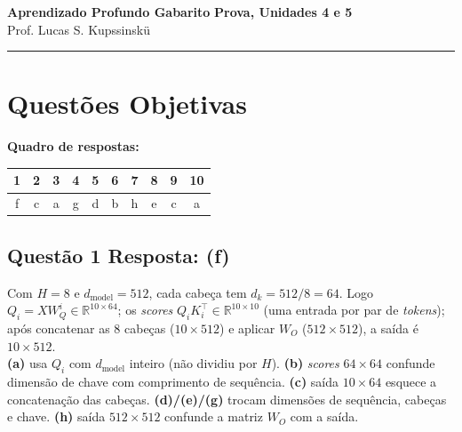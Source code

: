 \documentclass[11pt,a4paper]{article}
\begin{document}
{\Large\bfseries Aprendizado Profundo \textemdash{} Gabarito} \hfill \textbf{Prova, Unidades 4 e 5}\\
Prof. Lucas S. Kupssinskü

\rule{\linewidth}{0.8pt}

\section*{Questões Objetivas}

\textbf{Quadro de respostas:}
\begin{center}
\begin{tabular}{|c|c|c|c|c|c|c|c|c|c|}
\hline
1 & 2 & 3 & 4 & 5 & 6 & 7 & 8 & 9 & 10 \\\hline
f & c & a & g & d & b & h & e & c & a \\\hline
\end{tabular}
\end{center}

\color{blue}


\subsection*{Questão 1 \textemdash{} Resposta: (f)}
Com $H = 8$ e $d_{\text{model}} = 512$, cada cabeça tem $d_k = 512/8 = 64$. Logo $Q_i = X W_Q^i \in \mathbb{R}^{10 \times 64}$; os \textit{scores} $Q_i K_i^\top \in \mathbb{R}^{10 \times 10}$ (uma entrada por par de \textit{tokens}); após concatenar as $8$ cabeças ($10 \times 512$) e aplicar $W_O$ ($512\times 512$), a saída é $10 \times 512$.\\
\textbf{(a)} usa $Q_i$ com $d_{\text{model}}$ inteiro (não dividiu por $H$).
\textbf{(b)} \textit{scores} $64\times 64$ confunde dimensão de chave com comprimento de sequência.
\textbf{(c)} saída $10\times 64$ esquece a concatenação das cabeças.
\textbf{(d)/(e)/(g)} trocam dimensões de sequência, cabeças e chave.
\textbf{(h)} saída $512\times 512$ confunde a matriz $W_O$ com a saída.
\end{document}
